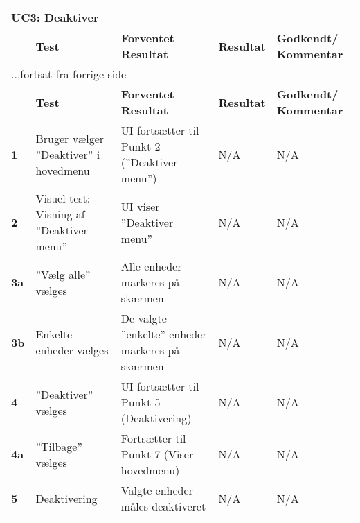 
\begin{center}
\begin{longtable}{|p{}|p{}|p{}|p{}|p{}|} %
\hline
\multicolumn{5}{|l|}{\textbf{UC3: Deaktiver}} \\ \hline
\multicolumn{1}{|c|}{} &
\textbf{Test} &
\textbf{Forventet \newline Resultat} &
\textbf{Resultat} &
\textbf{Godkendt/ \newline Kommentar} \\ \hline 
\endfirsthead

\multicolumn{5}{l}{...fortsat fra forrige side} \\ \hline 
\multicolumn{1}{|c|}{} &
\textbf{Test} &
\textbf{Forventet \newline Resultat} &
\textbf{Resultat} &
\textbf{Godkendt/ \newline Kommentar} \\ \hline 
\endhead


		
\textbf{1}			&Bruger vælger ''Deaktiver'' i hovedmenu															
					&UI fortsætter til Punkt 2 (''Deaktiver menu'')
					&N/A 
					&N/A \\\hline
					
\textbf{2}			&Visuel test: Visning af ''Deaktiver menu''																
					&UI viser ''Deaktiver menu''
					&N/A 
					&N/A \\\hline
		
\textbf{3a}			&''Vælg alle'' vælges		
					&Alle enheder markeres på skærmen		 	
					&N/A 
					&N/A \\\hline

\textbf{3b}			&Enkelte enheder vælges
					&De valgte ''enkelte'' enheder markeres på skærmen
					&N/A 
					&N/A \\\hline

\textbf{4}			&''Deaktiver'' vælges			
					&UI fortsætter til Punkt 5 (Deaktivering)
					&N/A 
					&N/A \\\hline
					
\textbf{4a}			&''Tilbage'' vælges			
					&Fortsætter til Punkt 7 (Viser hovedmenu)
					&N/A 
					&N/A \\\hline

\textbf{5}			&Deaktivering			
					&Valgte enheder måles deaktiveret
					&N/A 
					&N/A \\\hline
															

\end{longtable}
\end{center}
